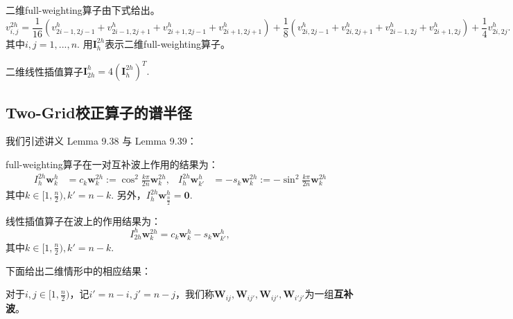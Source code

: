 \documentclass[lang=cn,10pt]{elegantbook}
\begin{document}
\begin{definition}
  二维full-weighting算子由下式给出。
  \begin{equation*}
  v^{2h}_{i,j}=\frac{1}{16}(v^h_{2i-1,2j-1}+v^h_{2i-1,2j+1}+v^h_{2i+1,2j-1}+v^h_{2i+1,2j+1})
  +\frac{1}{8}(v^h_{2i,2j-1}+v^h_{2i,2j+1}+v^h_{2i-1,2j}+v^h_{2i+1,2j}) + \frac{1}{4}v^h_{2i,2j}.
  \end{equation*}
  其中$i,j=1,...,n$. 用$\mathbf{I}_h^{2h}$表示二维full-weighting算子。
\end{definition}

\begin{definition}
  二维线性插值算子$\mathbf{I}_{2h}^h=4(\mathbf{I}_h^{2h})^T.$
\end{definition}

\subsection{Two-Grid校正算子的谱半径}

我们引述讲义 Lemma 9.38 与 Lemma 9.39：
\begin{lemma}
  full-weighting算子在一对互补波上作用的结果为：
  \begin{align}
    I_h^{2h} \mathbf{w}_k^h&=c_k\mathbf{w}_k^{2h}:=\cos^2\frac{k\pi}{2n}\mathbf{w}_k^{2h},
    & I_h^{2h} \mathbf{w}_{k'}^h&=-s_k\mathbf{w}_k^{2h}:=-\sin^2\frac{k\pi}{2n}\mathbf{w}_k^{2h}
  \end{align}
  其中$k\in[1,\frac{n}{2}),k'=n-k$. 另外，$I_h^{2h}\mathbf{w}_{\frac{n}{2}}^h=\mathbf{0}$.
\end{lemma}

\begin{lemma}
  线性插值算子在波上的作用结果为：
  \begin{equation}
    I^h_{2h} \mathbf{w}_k^{2h}=c_k\mathbf{w}_k^h-s_k\mathbf{w}_{k'}^h,
  \end{equation}
  其中$k\in[1,\frac{n}{2}),k'=n-k$.
\end{lemma}

下面给出二维情形中的相应结果：
\begin{definition}
  对于$i,j\in[1,\frac{n}{2})$，记$i'=n-i,j'=n-j$，我们称$\mathbf{W}_{ij},\mathbf{W}_{ij'},\mathbf{W}_{ij'},\mathbf{W}_{i'j'}$为一组\textbf{互补波}。
\end{definition}
\end{document}
